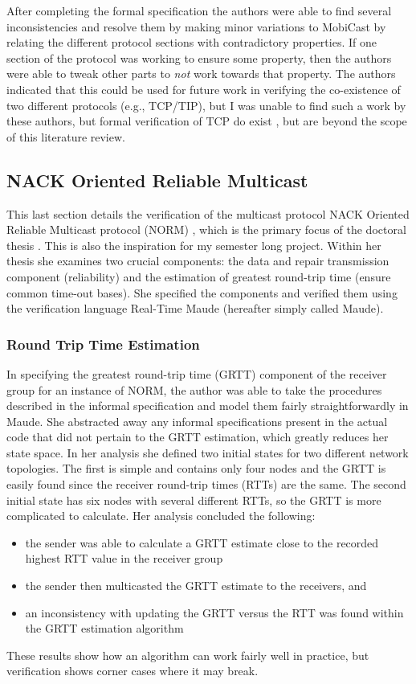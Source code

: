 \documentclass[12pt, fullpage]{article}
\begin{document}
\bigbreak
After completing the formal specification the authors were able to find several inconsistencies and resolve them by making minor variations to MobiCast by relating the different protocol sections with contradictory properties. If one section of the protocol was working to ensure some property, then the authors were able to tweak other parts to \textit{not} work towards that property. The authors indicated that this could be used for future work in verifying the co-existence of two different protocols (e.g., TCP/TIP), but I was unable to find such a work by these authors, but formal verification of TCP do exist \cite{Smith1997}, but are beyond the scope of this literature review.
\bigbreak
\subsection{NACK Oriented Reliable Multicast}
This last section details the verification of the multicast protocol NACK Oriented Reliable Multicast protocol (NORM) \cite{rfc5740}, which is the primary focus of the doctoral thesis \cite{Lien2004FormalMA}. This is also the inspiration for my semester long project. Within her thesis she examines two crucial components: the data and repair transmission component (reliability) and the estimation of greatest round-trip time (ensure common time-out bases). She specified the components and verified them using the verification language Real-Time Maude (hereafter simply called Maude).
\bigbreak
\subsubsection{Round Trip Time Estimation}
In specifying the greatest round-trip time (GRTT) component of the receiver group for an instance of NORM, the author was able to take the procedures described in the informal specification and model them fairly straightforwardly in Maude. She abstracted away any informal specifications present in the actual code that did not pertain to the GRTT estimation, which greatly reduces her state space.
\bigbreak
In her analysis she defined two initial states for two different network topologies. The first is simple and contains only four nodes and the GRTT is easily found since the receiver round-trip times (RTTs) are the same. The second initial state has six nodes with several different RTTs, so the GRTT is more complicated to calculate. Her analysis concluded the following: \begin{itemize}
	\item the sender was able to calculate a GRTT estimate close to the recorded highest RTT value in the receiver group
	\item the sender then multicasted the GRTT estimate to the receivers, and
	\item an inconsistency with updating the GRTT versus the RTT was found within the GRTT estimation algorithm
\end{itemize}
These results show how an algorithm can work fairly well in practice, but verification shows corner cases where it may break.
\bigbreak
\end{document}
